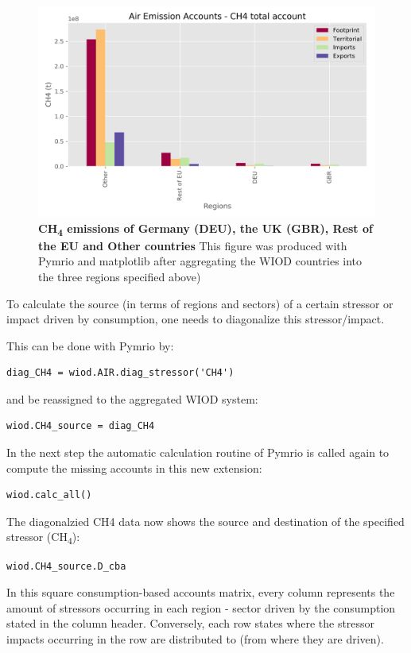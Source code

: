 \documentclass{jors}
\begin{document}
  \begin{figure}[h!]
      \includegraphics[width=.9\textwidth]{./fig/airch4.png}
      \caption{\textbf{CH\textsubscript{4} emissions of Germany (DEU), the UK (GBR), Rest of the EU and Other countries}
      This figure was produced with Pymrio and matplotlib after aggregating the WIOD countries into the three regions specified above)}
      \end{figure}



To calculate the source (in terms of regions and sectors) of a certain stressor or impact driven by consumption, one needs to diagonalize this stressor/impact. 

This can be done with Pymrio by:
\begin{lstlisting}
diag_CH4 = wiod.AIR.diag_stressor('CH4')
\end{lstlisting}

and be reassigned to the aggregated WIOD system:
\begin{lstlisting}
wiod.CH4_source = diag_CH4
\end{lstlisting}

In the next step the automatic calculation routine of Pymrio is called again to compute the missing accounts in this new extension:

\begin{lstlisting}
wiod.calc_all()
\end{lstlisting}

The diagonalzied CH4 data now shows the source and destination of the specified stressor (CH\textsubscript{4}):
\begin{lstlisting}
wiod.CH4_source.D_cba
\end{lstlisting}

In this square consumption-based accounts matrix, every column represents the amount of stressors occurring in each region - sector driven by the consumption stated in the column header. Conversely, each row states where the stressor impacts occurring in the row are distributed to (from where they are driven).
\end{document}
